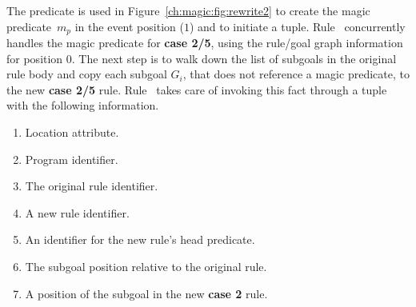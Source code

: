 The  predicate is used in Figure~\ref{ch:magic:fig:rewrite2} to
create the magic predicate~$m_p$ in the event position ($1$) and to initiate a
 tuple.  Rule~ concurrently handles the magic
predicate for {\bf case 2/5}, using the rule/goal graph information for 
position $0$.  The next step is to walk down the list of subgoals in the
original rule body and copy each subgoal $G_{i}$, that does not reference a
magic predicate, to the new {\bf case 2/5} rule.  Rule~ takes care of
invoking this fact through a  tuple with the following information.  
\begin{enumerate} 
  \ssp
  \item Location attribute.  
  \item Program identifier.
  \item The original rule identifier.
  \item A new rule identifier.
  \item An identifier for the new rule's head predicate.
  \item The subgoal position relative to the original rule.
  \item A position of the subgoal in the new {\bf case 2} rule.
\end{enumerate}


